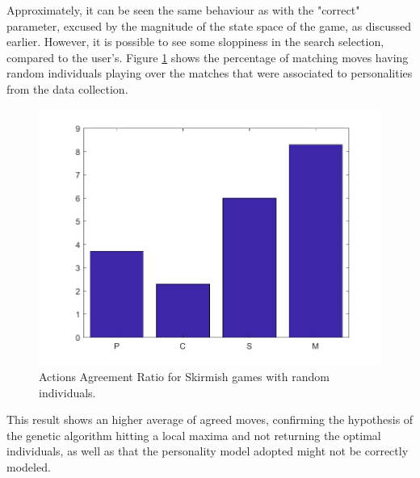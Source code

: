 Approximately, it can be seen the same behaviour as with the "correct" parameter, excused by the magnitude of the state space of the game, as discussed earlier. However, it is possible to see some sloppiness in the search selection, compared to the user's. Figure \ref{fig:skRan} shows the percentage of matching moves having random individuals playing over the matches that were associated to personalities from the data collection. 
\begin{figure}[H]
\centering
	\includegraphics[scale=0.5]{figure/eval/TotRandSk}
    \caption{Actions Agreement Ratio for Skirmish games with random individuals.}
    \label{fig:skRan}
\end{figure}
This result shows an higher average of agreed moves, confirming the hypothesis of the genetic algorithm hitting a local maxima and not returning the optimal individuals, as well as that the personality model adopted might not be correctly modeled.
